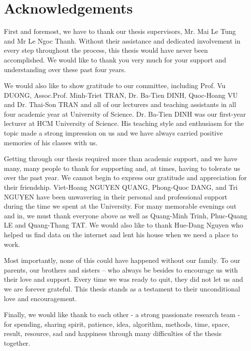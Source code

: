 \documentclass[oneside,13pt]{extreport}
\begin{document}
\clearpage
%
\chapter*{Acknowledgements}
\renewcommand{\thepage}{\roman{page}}
\setcounter{page}{1}

First and foremost, we have to thank our thesis supervisors, Mr. Mai Le Tung and Mr Le Ngoc Thanh. Without their assistance and dedicated involvement in every step throughout the process, this thesis would have never been accomplished. We would like to thank you very much for your support and understanding over these past four years.

We would also like to show gratitude to our committee, including Prof. Vu DUONG, Assoc.Prof. Minh-Triet TRAN, Dr. Ba-Tien DINH, Quoc-Hoang VU and Dr. Thai-Son TRAN and all of our lecturers and teaching assistants in all four academic year at University of Science. Dr. Ba-Tien DINH was our first-year lecturer at HCM University of Science. His teaching style and enthusiasm for the topic made a strong impression on us and we have always carried positive memories of his classes with us.

Getting through our thesis required more than academic support, and we have many, many people to thank for supporting and, at times, having to tolerate us over the past year. We cannot begin to express our gratitude and appreciation for their friendship. Viet-Hoang NGUYEN QUANG, Phong-Quoc DANG, and Tri NGUYEN have been unwavering in their personal and professional support during the time we spent at the University. For many memorable evenings out and in, we must thank everyone above as well as Quang-Minh Trinh, Phuc-Quang LE and Quang-Thang TAT. We would also like to thank Hue-Dang Nguyen who helped us find data on the internet and lent his house when we need a place to work.

Most importantly, none of this could have happened without our family. To our parents, our brothers and sisters – who always be besides to encourage us with their love and support. Every time we was ready to quit, they did not let us and we are forever grateful. This thesis stands as a testament to their unconditional love and encouragement.

Finally, we would like thank to each other - a strong passionate research team - for spending, sharing spirit, patience, idea, algorithm, methods, time, space, result, resource, sad and happiness through many difficulties of the thesis together.
\end{document}
